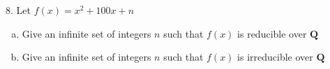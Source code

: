 \begin{mdframed}[style=darkQuesion]
  8. Let $f(x)=x^{2}+100 x+n$
  \begin{enumerate}[(a)]
\item{Give an infinite set of integers $n$ such that $f(x)$ is reducible over $\mathbf{Q}$}
\item{Give an infinite set of integers $n$ such that $f(x)$ is irreducible over $\mathbf{Q}$}
\end{enumerate} 
\end{mdframed}
\begin{mdframed}[style=darkAnswer,frametitle={Joe Starr}]
\end{mdframed}
\newpage
